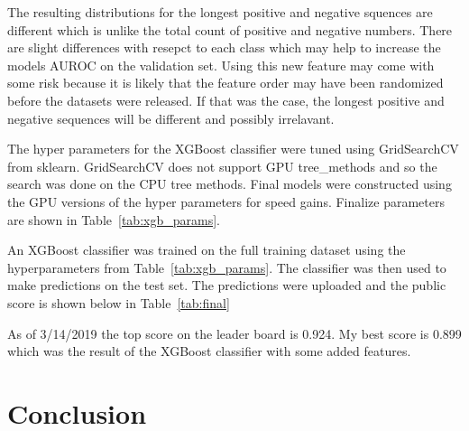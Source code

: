 \documentclass[11pt,letterpaper]{article}
\begin{document}
The resulting distributions for the longest positive and negative squences are
different which is unlike the total count of positive and negative numbers.
There are slight differences with resepct to each class which may help to
increase the models AUROC on the validation set.  Using this new feature may
come with some risk because it is likely that the feature order may have been
randomized before the datasets were released.  If that was the case, the
longest positive and negative sequences will be different and possibly
irrelavant.

The hyper parameters for the XGBoost classifier were tuned using GridSearchCV
from sklearn.  GridSearchCV does not support GPU tree\_methods and so the
search was done on the CPU tree methods.  Final models were constructed using
the GPU versions of the hyper parameters for speed gains.  Finalize parameters
are shown in Table~\ref{tab:xgb_params}.

\begin{table}[h!]
\centering
\caption{XGBoost final parameters}
\label{tab:xgb_params}
\end{table}

An XGBoost classifier was trained on the full training dataset using the
hyperparameters from Table~\ref{tab:xgb_params}.  The classifier was then used
to make predictions on the test set.  The predictions were uploaded and the
public score is shown below in Table~\ref{tab:final}

\begin{table}[h!]
\centering
\caption{Final public results}
\label{tab:final}
\end{table}

As of 3/14/2019 the top score on the leader board is 0.924.  My best score is
0.899 which was the result of the XGBoost classifier with some added features.  

\section{Conclusion}
\end{document}
